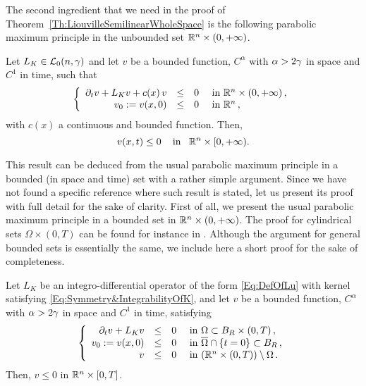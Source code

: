 The second ingredient that we need in the proof of Theorem~\ref{Th:LiouvilleSemilinearWholeSpace} is the following parabolic maximum principle in the unbounded set $\mathbb{R}^n \times (0,+\infty)$. 

\begin{proposition}
	\label{Prop:ParaMaxPrp}
	Let $L_K \in \mathcal{L}_0(n,\gamma)$ and let $v$ be a bounded function, $C^\alpha$ with $\alpha > 2\gamma$ in space and $C^1$ in time, such that
	\begin{equation*}
	\left\{\begin{array}{rcll}
	\partial_t v + L_K  v + c(x)\,v &\leq& 0 & \textrm{ in }\mathbb{R}^n\times(0,+\infty)\,,\\
	v_0:=v(x,0) &\leq& 0 & \textrm{ in } \mathbb{R}^n\,,
	\end{array} \right.
	\end{equation*}
	with $c(x)$ a continuous and bounded function. Then,
	$$ v(x,t) \leq 0 \,\,\,\,\,\text{ in } \,\,\, \mathbb{R}^n\times[0,+\infty). $$
\end{proposition}

This result can be deduced from the usual parabolic maximum principle in a bounded (in space and time) set with a rather simple argument. Since we have not found a specific reference where such result is stated, let us present its proof with full detail for the sake of clarity. First of all, we present the usual parabolic maximum principle in a bounded set in $\mathbb{R}^n \times (0,+\infty)$. The proof for cylindrical sets $\Omega \times (0,T)$ can be found for instance in \cite{BarriosPeralSoriaValdinoci}. Although the argument for general bounded sets is essentially the same,  we include here a short proof for the sake of completeness.

\begin{lemma}
\label{Lemma:ParabolicmaxPrpBdd}
Let $L_K$ be an integro-differential operator of the form \eqref{Eq:DefOfLu} with kernel satisfying \eqref{Eq:Symmetry&IntegrabilityOfK}, and let $v$ be a bounded function, $C^\alpha$ with $\alpha > 2\gamma$ in space and $C^1$ in time, satisfying
\begin{equation*}
\left\{\begin{array}{rcll}
\partial_t v + L_K v &\leq& 0 & \textrm{ in } \Omega \subset B_R\times(0,T)\,,\\
v_0:=v(x,0) &\leq& 0 & \textrm{ in } \overline{\Omega} \cap \{t=0\} \subset B_R\,,\\
v &\leq& 0 & \textrm{ in } ( \mathbb{R}^n \times (0,T))\setminus \Omega \,.
\end{array} \right.
\end{equation*}
Then, $v\leq 0$ in $\mathbb{R}^n\times [0,T]$.
\end{lemma}

